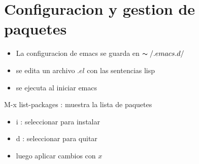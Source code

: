 \documentclass[a4paper, twocolumn]{article}
\begin{document}
\begin{landscape}
\begin{multicols}{2}
\begin{flushleft}
\begin{flushleft}
\end{flushleft} 
\end{flushleft}


\section*{Configuracion y gestion de paquetes}

\begin{flushleft}
\begin{itemize}
	\item La configuracion de emacs se guarda en $\thicksim/.emacs.d/$
	\item se edita un archivo $.el$ con las sentencias lisp
	\item se ejecuta al iniciar emacs
\end{itemize}

	\item M-x list-packages : muestra la lista de paquetes
	\begin{itemize}
		\item i : seleccionar para instalar
		\item d : seleccionar para quitar
		\item luego aplicar cambios con $x$
	\end{itemize}
\end{flushleft}


\end{multicols}
\end{landscape}
\end{document}
